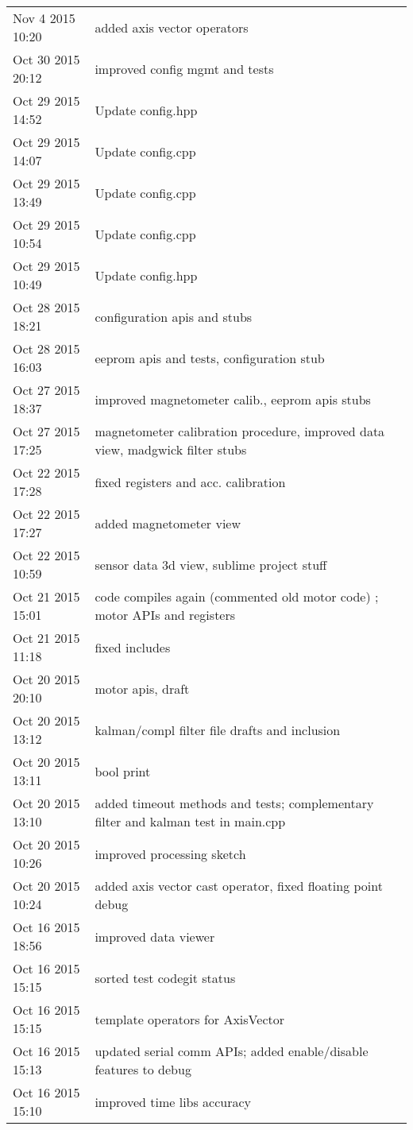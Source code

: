 \begin{tabular}{ l || p{12cm} }
	Nov 4 2015 10:20	& added axis vector operators	\\
	Oct 30 2015 20:12	& improved config mgmt and tests	\\
	Oct 29 2015 14:52	& Update config.hpp	\\
	Oct 29 2015 14:07	& Update config.cpp	\\
	Oct 29 2015 13:49	& Update config.cpp	\\
	Oct 29 2015 10:54	& Update config.cpp	\\
	Oct 29 2015 10:49	& Update config.hpp	\\
	Oct 28 2015 18:21	& configuration apis and stubs	\\
	Oct 28 2015 16:03	& eeprom apis and tests, configuration stub	\\
	Oct 27 2015 18:37	& improved magnetometer calib., eeprom apis stubs	\\
	Oct 27 2015 17:25	& magnetometer calibration procedure, improved data view, madgwick filter stubs	\\
	Oct 22 2015 17:28	& fixed registers and acc. calibration	\\
	Oct 22 2015 17:27	& added magnetometer view	\\
	Oct 22 2015 10:59	& sensor data 3d view, sublime project stuff	\\
	Oct 21 2015 15:01	& code compiles again (commented old motor code) ; motor APIs and registers	\\
	Oct 21 2015 11:18	& fixed includes	\\
	Oct 20 2015 20:10	& motor apis, draft	\\
	Oct 20 2015 13:12	& kalman/compl filter file drafts and inclusion	\\
	Oct 20 2015 13:11	& bool print	\\
	Oct 20 2015 13:10	& added timeout methods and tests; complementary filter and kalman test in main.cpp	\\
	Oct 20 2015 10:26	& improved processing sketch	\\
	Oct 20 2015 10:24	& added axis vector cast operator, fixed floating point debug	\\
	Oct 16 2015 18:56	& improved data viewer	\\
	Oct 16 2015 15:15	& sorted test codegit status	\\
	Oct 16 2015 15:15	& template operators for AxisVector	\\
	Oct 16 2015 15:13	& updated serial comm APIs; added enable/disable features to debug	\\
	Oct 16 2015 15:10	& improved time libs accuracy	\\

\end{tabular}
